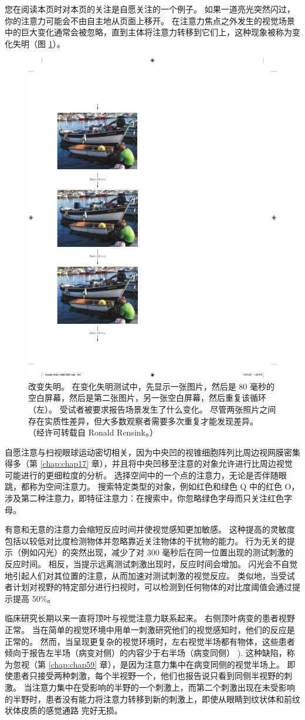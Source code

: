 您在阅读本页时对本页的关注是自愿关注的一个例子。 如果一道亮光突然闪过，你的注意力可能会不由自主地从页面上移开。 
在注意力焦点之外发生的视觉场景中的巨大变化通常会被忽略，直到主体将注意力转移到它们上，这种现象被称为变化失明（图 \ref{fig:25_8}）。


\begin{figure}[htbp]
	\centering
	\includegraphics[width=0.5\linewidth]{chap25/fig_25_8}
	\caption{改变失明。 在变化失明测试中，先显示一张图片，然后是 80 毫秒的空白屏幕，然后是第二张图片，另一张空白屏幕，然后重复该循环（左）。 受试者被要求报告场景发生了什么变化。 尽管两张照片之间存在实质性差异，但大多数观察者需要多次重复才能发现差异。 （经许可转载自 Ronald Rensink。）}
	\label{fig:25_8}
\end{figure}


自愿注意与扫视眼球运动密切相关，因为中央凹的视锥细胞阵列比周边视网膜密集得多（第 \ref{chap:chap17} 章），并且将中央凹移至注意的对象允许进行比周边视觉可能进行的更细粒度的分析。 选择空间中的一个点的注意力，无论是否伴随眼跳，都称为空间注意力。 搜索特定类型的对象，例如红色和绿色 Q 中的红色 O，涉及第二种注意力，即特征注意力：在搜索中，你忽略绿色字母而只关注红色字母。

有意和无意的注意力会缩短反应时间并使视觉感知更加敏感。 这种提高的灵敏度包括以较低对比度检测物体并忽略靠近关注物体的干扰物的能力。 行为无关的提示（例如闪光）的突然出现，减少了对 300 毫秒后在同一位置出现的测试刺激的反应时间。 相反，当提示远离测试刺激出现时，反应时间会增加。 闪光会不自觉地引起人们对其位置的注意，从而加速对测试刺激的视觉反应。 类似地，当受试者计划对视野的特定部分进行扫视时，可以检测到任何物体的对比度阈值会通过提示提高 50\%。

临床研究长期以来一直将顶叶与视觉注意力联系起来。 右侧顶叶病变的患者视野正常。 当在简单的视觉环境中用单一刺激研究他们的视觉感知时，他们的反应是正常的。 然而，当呈现更复杂的视觉环境时，左右视觉半场都有物体，这些患者倾向于报告左半场（病变对侧）的内容少于右半场（病变同侧） ). 这种缺陷，称为忽视（第 \ref{chap:chap59} 章），是因为注意力集中在病变同侧的视觉半场上。 即使患者只接受两种刺激，每个半视野一个，他们也报告说只看到同侧半视野的刺激。 当注意力集中在受影响的半野的一个刺激上，而第二个刺激出现在未受影响的半野时，患者没有能力将注意力转移到新的刺激上，即使从眼睛到纹状体和前纹状体皮质的感觉通路 完好无损。

